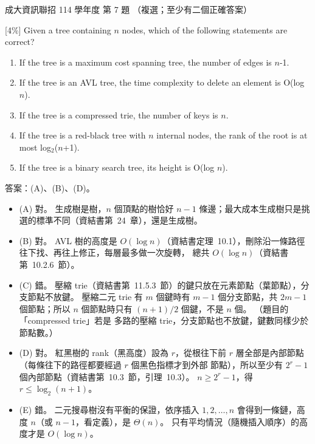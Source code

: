 \begin{pastexam}[label={px:ncku-114-prog-07}]{成大資訊聯招 114 學年度 第 7 題}
（複選；至少有二個正確答案）

{[4\%]} Given a tree containing $n$ nodes, which of the following statements are correct?
\begin{enumerate}[label=(\Alph*)]
\item If the tree is a maximum cost spanning tree, the number of edges is $n$-1.
\item If the tree is an AVL tree, the time complexity to delete an element is O(log $n$).
\item If the tree is a compressed trie, the number of keys is $n$.
\item If the tree is a red-black tree with $n$ internal nodes, the rank of the root is at most log$_2$($n$+1).
\item If the tree is a binary search tree, its height is O(log $n$).
\end{enumerate}
\end{pastexam}

\begin{pastsoln}
答案：(A)、(B)、(D)。

\begin{itemize}
\item (A) 對。 生成樹是樹，$n$ 個頂點的樹恰好 $n - 1$ 條邊；最大成本生成樹只是挑選的標準不同（資結書第~24~章），還是生成樹。
\item (B) 對。 AVL 樹的高度是 $O(\log n)$（資結書定理~10.1），刪除沿一條路徑往下找、再往上修正，每層最多做一次旋轉，
總共 $O(\log n)$（資結書第~10.2.6~節）。
\item (C) 錯。 壓縮 trie（資結書第~11.5.3~節）的鍵只放在元素節點（葉節點），分支節點不放鍵。 壓縮二元 trie 有 $m$ 個鍵時有
$m - 1$ 個分支節點，共 $2m - 1$ 個節點；所以 $n$ 個節點時只有 $(n + 1)/2$ 個鍵，不是 $n$ 個。 （題目的「compressed trie」若是
多路的壓縮 trie，分支節點也不放鍵，鍵數同樣少於節點數。）
\item (D) 對。 紅黑樹的 rank（黑高度）設為 $r$，從根往下前 $r$ 層全部是內部節點（每條往下的路徑都要經過 $r$ 個黑色指標才到外部
節點），所以至少有 $2^r - 1$ 個內部節點（資結書第~10.3~節，引理~10.3）。 $n \ge 2^r - 1$，得 $r \le \log_2(n + 1)$。
\item (E) 錯。 二元搜尋樹沒有平衡的保證，依序插入 $1, 2, \ldots, n$ 會得到一條鏈，高度 $n$（或 $n - 1$，看定義），是 $\Theta(n)$。
只有平均情況（隨機插入順序）的高度才是 $O(\log n)$。
\end{itemize}
\end{pastsoln}
